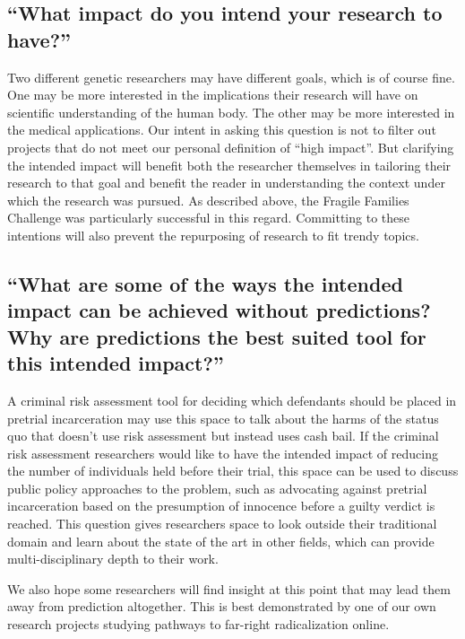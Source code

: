 \documentclass[12pt]{article}
\begin{document}
	\subsection{``What impact do you intend your research to have?''}
	
		Two different genetic researchers may have different goals, which is of course fine. One may be more interested in the implications their research will have on scientific understanding of the human body. The other may be more interested in the medical applications. Our intent in asking this question is not to filter out projects that do not meet our personal definition of ``high impact''. But clarifying the intended impact will benefit both the researcher themselves in tailoring their research to that goal and benefit the reader in understanding the context under which the research was pursued. As described above, the Fragile Families Challenge was particularly successful in this regard. Committing to these intentions will also prevent the repurposing of research to fit trendy topics. 

	\subsection{``What are some of the ways the intended impact can be achieved without predictions? Why are predictions the best suited tool for this intended impact?''}
		
		A criminal risk assessment tool for deciding which defendants should be placed in pretrial incarceration may use this space to talk about the harms of the status quo that doesn't use risk assessment but instead uses cash bail. If the criminal risk assessment researchers would like to have the intended impact of reducing the number of individuals held before their trial, this space can be used to discuss public policy approaches to the problem, such as advocating against pretrial incarceration based on the presumption of innocence before a guilty verdict is reached. This question gives researchers space to look outside their traditional domain and learn about the state of the art in other fields, which can provide multi-disciplinary depth to their work. 
		
		We also hope some researchers will find insight at this point that may lead them away from prediction altogether. This is best demonstrated by one of our own research projects studying pathways to far-right radicalization online. 
\end{document}
